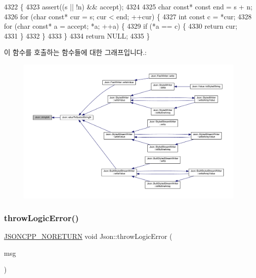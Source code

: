 \begin{DoxyCode}
4322                                                                          \{
4323   assert((s || !n) && accept);
4324 
4325   \textcolor{keywordtype}{char} \textcolor{keyword}{const}* \textcolor{keyword}{const} end = s + n;
4326   \textcolor{keywordflow}{for} (\textcolor{keywordtype}{char} \textcolor{keyword}{const}* cur = s; cur < end; ++cur) \{
4327     \textcolor{keywordtype}{int} \textcolor{keyword}{const} c = *cur;
4328     \textcolor{keywordflow}{for} (\textcolor{keywordtype}{char} \textcolor{keyword}{const}* a = accept; *a; ++a) \{
4329       \textcolor{keywordflow}{if} (*a == c) \{
4330         \textcolor{keywordflow}{return} cur;
4331       \}
4332     \}
4333   \}
4334   \textcolor{keywordflow}{return} NULL;
4335 \}
\end{DoxyCode}
이 함수를 호출하는 함수들에 대한 그래프입니다.\+:\nopagebreak
\begin{figure}[H]
\begin{center}
\leavevmode
\includegraphics[width=350pt]{namespace_json_a7492156d0c7d2dd2f672acacfb240320_icgraph}
\end{center}
\end{figure}
\mbox{\label{namespace_json_a27790f21f17922fac81e7cd72a5659a5}} 
\subsubsection{\texorpdfstring{throw\+Logic\+Error()}{throwLogicError()}}
{\footnotesize\ttfamily \hyperlink{json_8h_a78c5ba441d8b48f24a5095b97f01f282}{J\+S\+O\+N\+C\+P\+P\+\_\+\+N\+O\+R\+E\+T\+U\+RN} void Json\+::throw\+Logic\+Error (\begin{DoxyParamCaption}\item[{\hyperlink{json_8h_a1e723f95759de062585bc4a8fd3fa4be}{J\+S\+O\+N\+C\+P\+P\+\_\+\+S\+T\+R\+I\+NG} const \&}]{msg }\end{DoxyParamCaption})}



